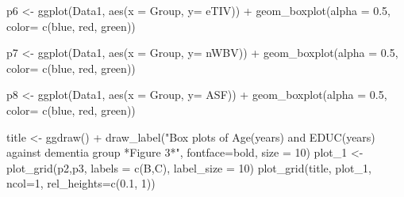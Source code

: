 \documentclass[
]{article}
\newenvironment{Shaded}{\begin{snugshade}}{\end{snugshade}}
\newcommand{\AttributeTok}[1]{\textcolor[rgb]{0.77,0.63,0.00}{#1}}
\newcommand{\DecValTok}[1]{\textcolor[rgb]{0.00,0.00,0.81}{#1}}
\newcommand{\FloatTok}[1]{\textcolor[rgb]{0.00,0.00,0.81}{#1}}
\newcommand{\FunctionTok}[1]{\textcolor[rgb]{0.00,0.00,0.00}{#1}}
\newcommand{\NormalTok}[1]{#1}
\newcommand{\OtherTok}[1]{\textcolor[rgb]{0.56,0.35,0.01}{#1}}
\newcommand{\SpecialCharTok}[1]{\textcolor[rgb]{0.00,0.00,0.00}{#1}}
\newcommand{\StringTok}[1]{\textcolor[rgb]{0.31,0.60,0.02}{#1}}
\begin{document}
\begin{Shaded}
\begin{Highlighting}[]
\NormalTok{p6 }\OtherTok{\textless{}{-}} \FunctionTok{ggplot}\NormalTok{(Data1, }\FunctionTok{aes}\NormalTok{(}\AttributeTok{x =}\NormalTok{ Group, }\AttributeTok{y=}\NormalTok{ eTIV)) }\SpecialCharTok{+}
  \FunctionTok{geom\_boxplot}\NormalTok{(}\AttributeTok{alpha =} \FloatTok{0.5}\NormalTok{, }\AttributeTok{color=} \FunctionTok{c}\NormalTok{(}\StringTok{\textquotesingle{}blue\textquotesingle{}}\NormalTok{, }\StringTok{\textquotesingle{}red\textquotesingle{}}\NormalTok{, }\StringTok{\textquotesingle{}green\textquotesingle{}}\NormalTok{)) }
  
\NormalTok{p7 }\OtherTok{\textless{}{-}} \FunctionTok{ggplot}\NormalTok{(Data1, }\FunctionTok{aes}\NormalTok{(}\AttributeTok{x =}\NormalTok{ Group, }\AttributeTok{y=}\NormalTok{ nWBV)) }\SpecialCharTok{+}
  \FunctionTok{geom\_boxplot}\NormalTok{(}\AttributeTok{alpha =} \FloatTok{0.5}\NormalTok{, }\AttributeTok{color=} \FunctionTok{c}\NormalTok{(}\StringTok{\textquotesingle{}blue\textquotesingle{}}\NormalTok{, }\StringTok{\textquotesingle{}red\textquotesingle{}}\NormalTok{, }\StringTok{\textquotesingle{}green\textquotesingle{}}\NormalTok{)) }

\NormalTok{p8 }\OtherTok{\textless{}{-}} \FunctionTok{ggplot}\NormalTok{(Data1, }\FunctionTok{aes}\NormalTok{(}\AttributeTok{x =}\NormalTok{ Group, }\AttributeTok{y=}\NormalTok{ ASF)) }\SpecialCharTok{+}
  \FunctionTok{geom\_boxplot}\NormalTok{(}\AttributeTok{alpha =} \FloatTok{0.5}\NormalTok{, }\AttributeTok{color=} \FunctionTok{c}\NormalTok{(}\StringTok{\textquotesingle{}blue\textquotesingle{}}\NormalTok{, }\StringTok{\textquotesingle{}red\textquotesingle{}}\NormalTok{, }\StringTok{\textquotesingle{}green\textquotesingle{}}\NormalTok{)) }
  

\NormalTok{title }\OtherTok{\textless{}{-}} \FunctionTok{ggdraw}\NormalTok{() }\SpecialCharTok{+} \FunctionTok{draw\_label}\NormalTok{(}\StringTok{"Box plots of Age(years) and EDUC(years) against dementia group *Figure 3*"}\NormalTok{, }\AttributeTok{fontface=}\StringTok{\textquotesingle{}bold\textquotesingle{}}\NormalTok{, }\AttributeTok{size =} \DecValTok{10}\NormalTok{)}
\NormalTok{plot\_1 }\OtherTok{\textless{}{-}} \FunctionTok{plot\_grid}\NormalTok{(p2,p3, }\AttributeTok{labels =} \FunctionTok{c}\NormalTok{(}\StringTok{\textquotesingle{}B\textquotesingle{}}\NormalTok{,}\StringTok{\textquotesingle{}C\textquotesingle{}}\NormalTok{), }\AttributeTok{label\_size =} \DecValTok{10}\NormalTok{)}
\FunctionTok{plot\_grid}\NormalTok{(title, plot\_1, }\AttributeTok{ncol=}\DecValTok{1}\NormalTok{, }\AttributeTok{rel\_heights=}\FunctionTok{c}\NormalTok{(}\FloatTok{0.1}\NormalTok{, }\DecValTok{1}\NormalTok{))}
\end{Highlighting}
\end{Shaded}
\end{document}
